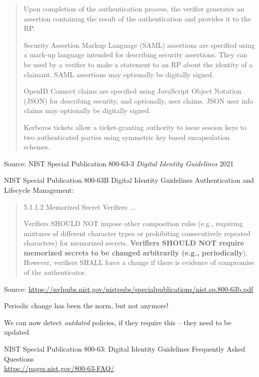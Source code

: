 \documentclass[Screen16to9,17pt]{foils}
\begin{document}


\begin{quote}
Upon completion of the authentication process, the verifier generates an assertion containing the
result of the authentication and provides it to the RP.
\begin{list2}
\item Security Assertion Markup Language (SAML) assertions are specified using a mark-up
language intended for describing security assertions. They can be used by a verifier to
make a statement to an RP about the identity of a claimant. SAML assertions may
optionally be digitally signed.
\item OpenID Connect claims are specified using JavaScript Object Notation (JSON) for
describing security, and optionally, user claims. JSON user info claims may optionally be
digitally signed.
\item Kerberos tickets allow a ticket-granting authority to issue session keys to two
authenticated parties using symmetric key based encapsulation schemes.
\end{list2}
\end{quote}
Source: NIST Special Publication 800-63-3 \emph{Digital Identity Guidelines} 2021





NIST Special Publication 800-63B
Digital Identity Guidelines
Authentication and Lifecycle Management:
\begin{quote}
5.1.1.2 Memorized Secret Verifiers
...

Verifiers SHOULD NOT impose other composition rules (e.g., requiring mixtures of different
character types or prohibiting consecutively repeated characters) for memorized secrets.{\bf
Verifiers SHOULD NOT require memorized secrets to be changed arbitrarily (e.g., periodically}).
However, verifiers SHALL force a change if there is evidence of compromise of the
authenticator.
\end{quote}
Source: \url{https://nvlpubs.nist.gov/nistpubs/specialpublications/nist.sp.800-63b.pdf}

\begin{list2}
\item Periodic change has been the norm, but not anymore!
\item We can now detect \emph{outdated} policies, if they require this -- they need to be updated
\item NIST Special Publication 800-63: Digital Identity Guidelines
Frequently Asked Questions\\
\url{https://pages.nist.gov/800-63-FAQ/}
\end{list2}
\end{document}
